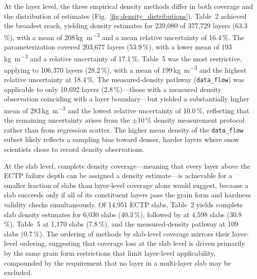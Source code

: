 \documentclass[hess, manuscript]{copernicus}
\begin{document}
At the layer level, the three empirical density methods differ in both coverage and the distribution of estimates (Fig.~\ref{fig:density_distributions}). \citet{kimjamieson2009} Table~2 achieved the broadest reach, yielding density estimates for 239{,}080 of 377{,}729 layers (63.3\,\%), with a mean of 208\,\si{kg.m^{-3}} and a mean relative uncertainty of 16.4\,\%. The \citet{geldsetzer2009} parameterization covered 203{,}677 layers (53.9\,\%), with a lower mean of 193\,\si{kg.m^{-3}} and a relative uncertainty of 17.1\,\%. \citet{kimjamieson2009} Table~5 was the most restrictive, applying to 106{,}370 layers (28.2\,\%), with a mean of 199\,\si{kg.m^{-3}} and the highest relative uncertainty at 18.4\,\%. The measured-density pathway (\texttt{data\_flow}) was applicable to only 10{,}692 layers (2.8\,\%)—those with a measured density observation coinciding with a layer boundary—but yielded a substantially higher mean of 283\,\si{kg.m^{-3}} and the lowest relative uncertainty of 10.0\,\%, reflecting that the remaining uncertainty arises from the $\pm$10\,\% density measurement protocol rather than from regression scatter. The higher mean density of the \texttt{data\_flow} subset likely reflects a sampling bias toward denser, harder layers where snow scientists chose to record density observations.


At the slab level, complete density coverage—meaning that every layer above the ECTP failure depth can be assigned a density estimate—is achievable for a smaller fraction of slabs than layer-level coverage alone would suggest, because a slab succeeds only if all of its constituent layers pass the grain form and hardness validity checks simultaneously. Of 14{,}951 ECTP slabs, \citeauthor{kimjamieson2009} Table~2 yields complete slab density estimates for 6{,}030 slabs (40.3\,\%), followed by \citet{geldsetzer2009} at 4{,}598 slabs (30.8\,\%), \citeauthor{kimjamieson2009} Table~5 at 1{,}170 slabs (7.8\,\%), and the measured-density pathway at 109 slabs (0.7\,\%). The ordering of methods by slab-level coverage mirrors their layer-level ordering, suggesting that coverage loss at the slab level is driven primarily by the same grain form restrictions that limit layer-level applicability, compounded by the requirement that no layer in a multi-layer slab may be excluded.
\end{document}

